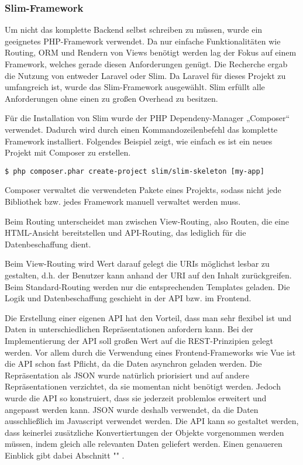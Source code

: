 \subsubsection{Slim-Framework}  
\label{sec:Slim-Framework-1}

Um nicht das komplette Backend selbst schreiben zu müssen, wurde ein geeignetes \ac{PHP}-Framework verwendet. Da nur einfache Funktionalitäten wie Routing, \ac{ORM} und Rendern von Views benötigt werden lag der Fokus auf einem Framework, welches gerade diesen Anforderungen genügt. Die Recherche ergab die Nutzung von entweder Laravel oder Slim. Da Laravel für dieses Projekt zu umfangreich ist, wurde das Slim-Framework ausgewählt. Slim erfüllt alle Anforderungen ohne einen zu großen Overhead zu besitzen. 

Für die Installation von Slim wurde der \ac{PHP} Dependeny-Manager „Composer“ verwendet. Dadurch wird durch einen Kommandozeilenbefehl das komplette Framework installiert.
Folgendes Beispiel zeigt, wie einfach es ist ein neues Projekt mit Composer zu erstellen.
 
\begin{lstlisting}[frame=single] 
$ php composer.phar create-project slim/slim-skeleton [my-app]
\end{lstlisting}

Composer verwaltet die verwendeten Pakete eines Projekts, sodass nicht jede Bibliothek bzw. jedes Framework manuell verwaltet werden muss.	

Beim Routing unterscheidet man zwischen View-Routing, also Routen, die eine \ac{HTML}-Ansicht bereitstellen und \ac{API}-Routing, das lediglich für die Datenbeschaffung dient. 

Beim View-Routing wird Wert darauf gelegt die \ac{URI}s möglichst lesbar zu gestalten, d.h. der Benutzer kann anhand der \ac{URI} auf den Inhalt zurückgreifen. 
Beim Standard-Routing werden nur die entsprechenden Templates geladen. Die Logik und Datenbeschaffung geschieht in der \ac{API} bzw. im Frontend.

Die Erstellung einer eigenen \ac{API} hat den Vorteil, dass man sehr flexibel ist und Daten in unterschiedlichen Repräsentationen anfordern kann. Bei der Implementierung der \ac{API} soll großen Wert auf die \ac{REST}-Prinzipien gelegt werden. 
Vor allem durch die Verwendung eines Frontend-Frameworks wie Vue ist die \ac{API} schon fast Pflicht, da die Daten asynchron geladen werden.
Die Repräsentation als \ac{JSON} wurde natürlich priorisiert und auf andere Repräsentationen verzichtet, da sie momentan nicht benötigt werden. Jedoch wurde die \ac{API} so konstruiert, dass sie jederzeit problemlos erweitert und angepasst werden kann. \ac{JSON} wurde deshalb verwendet, da die Daten ausschließlich im Javascript verwendet werden. Die \ac{API} kann so gestaltet werden, dass keinerlei zusätzliche Konvertiertungen der Objekte vorgenommen werden müssen, indem gleich alle relevanten Daten geliefert werden.
Einen genaueren Einblick gibt dabei Abschnitt "" .

